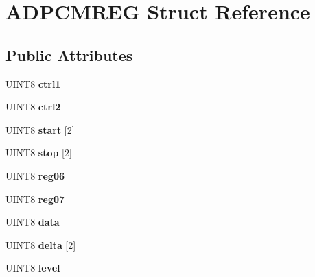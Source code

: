 \hypertarget{structADPCMREG}{\section{A\-D\-P\-C\-M\-R\-E\-G Struct Reference}
\label{structADPCMREG}
}
\subsection*{Public Attributes}
\begin{DoxyCompactItemize}
\item 
\hypertarget{structADPCMREG_a08eb565121ea289faf0bb15db1eebf9e}{U\-I\-N\-T8 {\bfseries ctrl1}}\label{structADPCMREG_a08eb565121ea289faf0bb15db1eebf9e}

\item 
\hypertarget{structADPCMREG_aa8c4243b39403a669ec3c11c6e06c5a8}{U\-I\-N\-T8 {\bfseries ctrl2}}\label{structADPCMREG_aa8c4243b39403a669ec3c11c6e06c5a8}

\item 
\hypertarget{structADPCMREG_a49fc7d504a03a2fc995f65937e7a3875}{U\-I\-N\-T8 {\bfseries start} \mbox{[}2\mbox{]}}\label{structADPCMREG_a49fc7d504a03a2fc995f65937e7a3875}

\item 
\hypertarget{structADPCMREG_accdb48d3e698d946c4858c25f0c612c3}{U\-I\-N\-T8 {\bfseries stop} \mbox{[}2\mbox{]}}\label{structADPCMREG_accdb48d3e698d946c4858c25f0c612c3}

\item 
\hypertarget{structADPCMREG_a20a7e10ee5cead353dd8683126bb1abd}{U\-I\-N\-T8 {\bfseries reg06}}\label{structADPCMREG_a20a7e10ee5cead353dd8683126bb1abd}

\item 
\hypertarget{structADPCMREG_a22945b67fea1a23b61bb4640eff8d55a}{U\-I\-N\-T8 {\bfseries reg07}}\label{structADPCMREG_a22945b67fea1a23b61bb4640eff8d55a}

\item 
\hypertarget{structADPCMREG_a90bbafae370b28864d984837e228fd3f}{U\-I\-N\-T8 {\bfseries data}}\label{structADPCMREG_a90bbafae370b28864d984837e228fd3f}

\item 
\hypertarget{structADPCMREG_abb4ebdf85f84e034f9c9d9943a707c14}{U\-I\-N\-T8 {\bfseries delta} \mbox{[}2\mbox{]}}\label{structADPCMREG_abb4ebdf85f84e034f9c9d9943a707c14}

\item 
\hypertarget{structADPCMREG_af1e08f76c07f276d9331eb882a25ebd9}{U\-I\-N\-T8 {\bfseries level}}\label{structADPCMREG_af1e08f76c07f276d9331eb882a25ebd9}


\end{DoxyCompactItemize}
